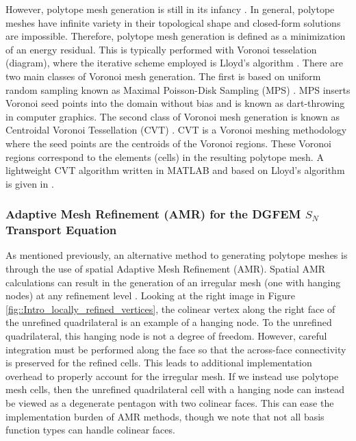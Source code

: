 However, polytope mesh generation is still in its infancy \cite{yip2005automated,sieger2010optimizing,ebeida2011uniform}. In general, polytope meshes have infinite variety in their topological shape and closed-form solutions are impossible. Therefore, polytope mesh generation is defined as a minimization of an energy residual. This is typically performed with Voronoi tesselation (diagram), where the iterative scheme employed is Lloyd's algorithm \cite{lloyd1982least,linde1980algorithm}. There are two main classes of Voronoi mesh generation. The first is based on uniform random sampling known as Maximal Poisson-Disk Sampling (MPS) \cite{ebeida2011uniform,ebeida2011efficient,ebeida2012simple}. MPS inserts Voronoi seed points into the domain without bias and is known as dart-throwing in computer graphics. The second class of Voronoi mesh generation is known as Centroidal Voronoi Tessellation (CVT) \cite{du1999centroidal,valette2004approximated}. CVT is a Voronoi meshing methodology where the seed points are the centroids of the Voronoi regions. These Voronoi regions correspond to the elements (cells) in the resulting polytope mesh. A lightweight CVT algorithm written in MATLAB and based on Lloyd's algorithm is given in \cite{talischi2012polymesher}.

\subsubsection{Adaptive Mesh Refinement (AMR) for the DGFEM $S_N$ Transport Equation}
\label{sec::Intro_Past_Polytopes_AMR}

As mentioned previously, an alternative method to generating polytope meshes is through the use of spatial Adaptive Mesh Refinement (AMR). Spatial AMR calculations can result in the generation of an irregular mesh (one with hanging nodes) at any refinement level \cite{carey1997computational,plewa2005adaptive}. Looking at the right image in Figure \ref{fig::Intro_locally_refined_vertices}, the colinear vertex along the right face of the unrefined quadrilateral is an example of a hanging node. To the unrefined quadrilateral, this hanging node is not a degree of freedom. However, careful integration must be performed along the face so that the across-face connectivity is preserved for the refined cells. This leads to additional implementation overhead to properly account for the irregular mesh. If we instead use polytope mesh cells, then the unrefined quadrilateral cell with a hanging node can instead be viewed as a degenerate pentagon with two colinear faces. This can ease the implementation burden of AMR methods, though we note that not all basis function types can handle colinear faces.

